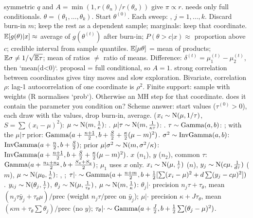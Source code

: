 \sk{} symmetric $q$ and $A=\min(1,r(\theta_n)/r(\theta_o))$ give $\pi\propto r$.
\bx
{} needs only full conditionals. $\theta=(\theta_1,\dots,\theta_k)$. Start $\theta^{(0)}$. Each sweep: , $j=1,\dots,k$. Discard burn-in $m$; keep the rest as a dependent sample; marginals: keep that coordinate.
\sk{} $\mathbb{E}[g(\theta)|x]\approx$ average of $g(\theta^{(t)})$ after burn-in; $P(\theta>c|x)\approx$ proportion above $c$; credible interval from sample quantiles.  $\mathbb{E}[\mu\theta]$ = mean of products; $\mathbb{E}\sigma\ne1/\sqrt{\mathbb{E}\tau}$; mean of ratios $\ne$ ratio of means. Difference: $\delta^{(t)}=\mu_1^{(t)}-\mu_2^{(t)}$, then `mean(d<0)`.
\sk{} proposal = full conditional, so $A=1$.  strong correlation between coordinates gives tiny moves and slow exploration. Bivariate, correlation $\rho$: lag-1 autocorrelation of one coordinate is $\rho^2$.
\sk{} Finite support: sample with weights (R normalises `prob`). Otherwise an MH step for that coordinate.
\sk{} does it contain the parameter you condition on? Scheme answer: start values ($\tau^{(0)}>0$), each draw with the  values, drop burn-in, average.
\sk{} ($x_i\sim\mathrm{N}(\mu,1/\tau)$, $S=\sum(x_i-\mu)^2$):
\li$\mu\sim\mathrm{N}(m,\frac1\kappa)$: .
\li$\mu|\tau\sim\mathrm{N}(m,\frac1{\kappa\tau})$: .
\li$\tau\sim\mathrm{Gamma}(a,b)$: ; with the $\mu|\tau$ prior: $\mathrm{Gamma}(a+\frac{n+1}2,b+\frac S2+\frac\kappa2(\mu-m)^2)$.
\li$\sigma^2\sim\mathrm{InvGamma}(a,b)$: $\mathrm{InvGamma}(a+\frac n2,b+\frac S2)$; prior $\mu|\sigma^2\sim\mathrm{N}(m,\sigma^2/\kappa)$: $\mathrm{InvGamma}(a+\frac{n+1}2,b+\frac S2+\frac\kappa2(\mu-m)^2)$.
\li{} $x$ ($n_1$), $y$ ($n_2$), common $\tau$: $\mathrm{Gamma}(a+\frac{n_1+n_2}2,b+\frac{S_x+S_y}2)$; $\mu_1$ uses $x$ only.
\li{} $x_i\sim\mathrm{N}(\mu,\frac1\tau)$ ($n$), $y_j\sim\mathrm{N}(c\mu,\frac1{d\tau})$ ($m$), $\mu\sim\mathrm{N}(\mu_0,\frac1\kappa)$: , ; $\tau|\cdot\sim\mathrm{Gamma}(a+\frac{n+m}2,b+\frac12[\sum(x_i-\mu)^2+d\sum(y_j-c\mu)^2])$.
\li{} $y_{ij}\sim\mathrm{N}(\theta_j,\frac1\tau)$, $\theta_j\sim\mathrm{N}(\mu,\frac1{\tau_\theta})$, $\mu\sim\mathrm{N}(m,\frac1\kappa)$: $\theta_j|\cdot$ precision $n_j\tau+\tau_\theta$, mean $(n_j\tau\bar y_j+\tau_\theta\mu)/$prec (weight $n_j\tau/$prec on $\bar y_j$); $\mu|\cdot$ precision $\kappa+J\tau_\theta$, mean $(\kappa m+\tau_\theta\sum\theta_j)/$prec (no $y$); $\tau_\theta|\cdot\sim\mathrm{Gamma}(a+\frac J2,b+\frac12\sum(\theta_j-\mu)^2)$.
